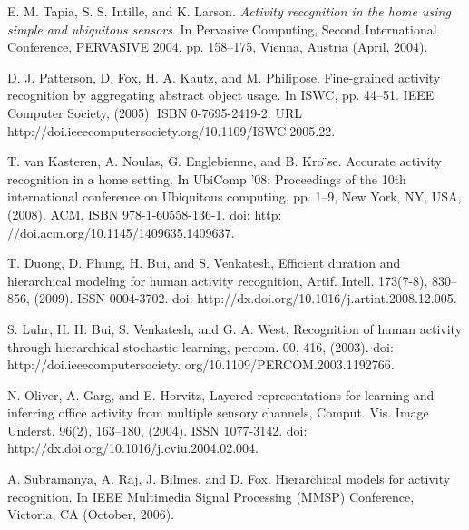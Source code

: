 \documentclass[11pt, oneside]{article}   	%
\begin{document}
\begin{thebibliography}{1}
	
 E. M. Tapia, S. S. Intille, and K. Larson. {\em Activity recognition in the home using simple and ubiquitous sensors}. In Pervasive Computing, Second International Conference, PERVASIVE 2004, pp. 158–175, Vienna, Austria (April, 2004).

  D. J. Patterson, D. Fox, H. A. Kautz, and M. Philipose. Fine-grained activity recognition by aggregating abstract object usage. In ISWC, pp. 44–51. IEEE Computer Society, (2005). ISBN 0-7695-2419-2. URL http://doi.ieeecomputersociety.org/10.1109/ISWC.2005.22.

  T. van Kasteren, A. Noulas, G. Englebienne, and B. Kro ̈se. Accurate activity recognition in a home setting. In UbiComp ’08: Proceedings of the 10th international conference on Ubiquitous computing, pp. 1–9, New York, NY, USA, (2008). ACM. ISBN 978-1-60558-136-1. doi: http: //doi.acm.org/10.1145/1409635.1409637.

  T. Duong, D. Phung, H. Bui, and S. Venkatesh, Efficient duration and hierarchical modeling for human activity recognition, Artif. Intell. 173(7-8), 830–856, (2009). ISSN 0004-3702. doi: http://dx.doi.org/10.1016/j.artint.2008.12.005.

  S. Luhr, H. H. Bui, S. Venkatesh, and G. A. West, Recognition of human activity through hierarchical stochastic learning, percom. 00, 416, (2003). doi: http://doi.ieeecomputersociety. org/10.1109/PERCOM.2003.1192766.

  N. Oliver, A. Garg, and E. Horvitz, Layered representations for learning and inferring office activity from multiple sensory channels, Comput. Vis. Image Underst. 96(2), 163–180, (2004). ISSN 1077-3142. doi: http://dx.doi.org/10.1016/j.cviu.2004.02.004.

  A. Subramanya, A. Raj, J. Bilmes, and D. Fox. Hierarchical models for activity recognition. In IEEE Multimedia Signal Processing (MMSP) Conference, Victoria, CA (October, 2006).


\end{thebibliography}
\end{document}
